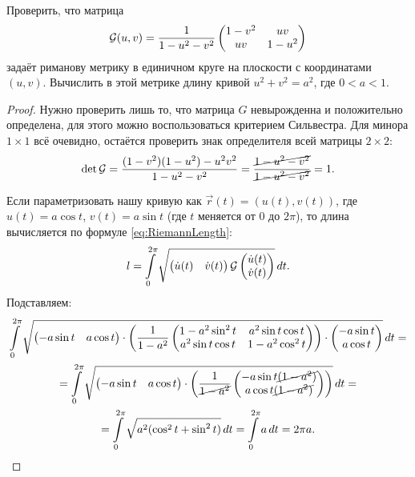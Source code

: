 \begin{problem}
	Проверить, что матрица
	\[
		\mathcal{G}(u, v) = \frac{1}{1 - u^2 - v^2}
		\begin{pmatrix}
			1 - v^2 & uv\\
			uv & 1 - u^2
		\end{pmatrix}
	\]
	задаёт риманову метрику в единичном круге на плоскости с координатами $(u, v)$. Вычислить в этой метрике длину кривой $u^2 + v^2 = a^2$, где $0 < a < 1$.
\end{problem}

\begin{proof}
	Нужно проверить лишь то, что матрица $G$ невырожденна и положительно определена, для этого можно воспользоваться критерием Сильвестра. Для минора $1 \times 1$ всё очевидно, остаётся проверить знак определителя всей матрицы $2 \times 2$:
	\[
		\det\mathcal{G} = \frac{(1 - v^2)(1 - u^2) - u^2v^2}{1 - u^2 - v^2} = \frac{\cancel{1 - u^2 - v^2}}{\cancel{1 - u^2 - v^2}} = 1.
	\]
	
	Если параметризовать нашу кривую как $\vec{r}(t) = (u(t), v(t))$, где $u(t) = a\cos t$, $v(t) = a\sin t$ (где $t$ меняется от $0$ до $2\pi$), то длина вычисляется по формуле \eqref{eq:RiemannLength}:
	\[
		l = \int\limits_0^{2\pi}\sqrt{\begin{pmatrix}\dot{u}(t) & \dot{v}(t)\end{pmatrix} \mathcal{G} \begin{pmatrix}\dot{u}(t) \\ \dot{v}(t) \end{pmatrix}}\,dt.
	\]
	Подставляем:
	\begin{multline*}
		\int\limits_0^{2\pi}\sqrt{\begin{pmatrix}-a\sin t & a\cos t\end{pmatrix} \cdot \left(\frac{1}{1 - a^2}\begin{pmatrix} 1 - a^2\sin^2t & a^2\sin t\cos t \\ a^2\sin t\cos t & 1 - a^2\cos^2t \end{pmatrix}\right) \cdot \begin{pmatrix} -a\sin t \\ a\cos t \end{pmatrix}}\,dt =\\ = \int\limits_0^{2\pi}\sqrt{\begin{pmatrix} -a\sin t & a\cos t \end{pmatrix} \cdot \left(\frac{1}{\cancel{1 - a^2}}\begin{pmatrix} -a\sin t\cancel{(1 - a^2)} \\ a\cos t\cancel{(1 - a^2)}\end{pmatrix}\right)}\,dt =\\ = \int\limits_0^{2\pi}\sqrt{a^2(\cos^2t + \sin^2t)}\,dt = \int\limits_0^{2\pi}a\,dt = 2\pi a.
	\end{multline*}
\end{proof}

